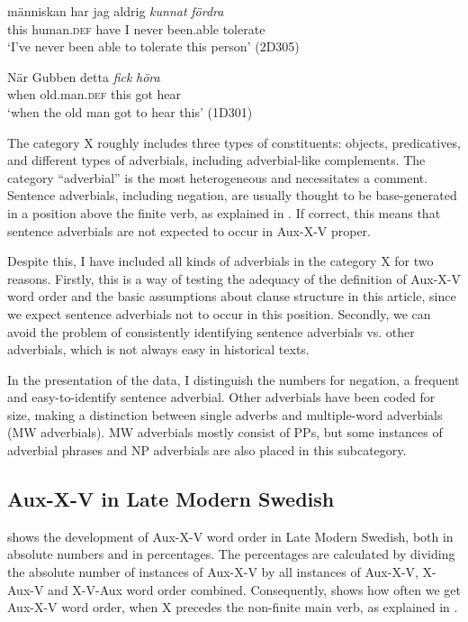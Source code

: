 \documentclass[output=paper, colorlinks, citecolor=brown]{langscibook}
\begin{document}
\ea
\label{ex:sangfelt:25} %
\ea\label{ex:sangfelt:25a} 
 {människan} har jag aldrig \textit{kunnat} \textit{fördra} \\
 this human.\textsc{def} have I never been.able tolerate\\
\glt ‘I’ve never been able to tolerate this person’ (2D305)

\ex\label{ex:sangfelt:25b} 
\gll När Gubben {detta} \textit{fick} \textit{höra} \\
 when old.man.\textsc{def} this got hear\\
\glt ‘when the old man got to hear this’ (1D301)
\z
\z

\begin{sloppypar}
The category X roughly includes three types of constituents: objects, predicatives, and different types of adverbials, including adverbial-like complements. The category “adverbial” is the most heterogeneous and necessitates a comment. Sentence adverbials, including negation, are usually thought to be base-generated in a position above the finite verb, as explained in . If correct, this means that sentence adverbials are not expected to occur in Aux-X-V proper.
\end{sloppypar}

Despite this, I have included all kinds of adverbials in the category X for two reasons. Firstly, this is a way of testing the adequacy of the definition of Aux-X-V word order and the basic assumptions about clause structure in this article, since we expect sentence adverbials not to occur in this position. Secondly, we can avoid the problem of consistently identifying sentence adverbials vs. other adverbials, which is not always easy in historical texts.



In the presentation of the data, I distinguish the numbers for negation, a frequent and easy-to-identify sentence adverbial. Other adverbials have been coded for size, making a distinction between single adverbs and multiple-word adverbials (MW adverbials). MW adverbials mostly consist of PPs, but some instances of adverbial phrases and NP adverbials are also placed in this subcategory.


\subsection{Aux-X-V in Late Modern Swedish}\label{sec:sangfelt:4.2}

 shows the development of Aux-X-V word order in Late Modern Swedish, both in absolute numbers and in percentages. The percentages are calculated by dividing the absolute number of instances of Aux-X-V by all instances of Aux-X-V, X-Aux-V and X-V-Aux word order combined. Consequently,  shows how often we get Aux-X-V word order, when X precedes the non-finite main verb, as explained in .
\end{document}
